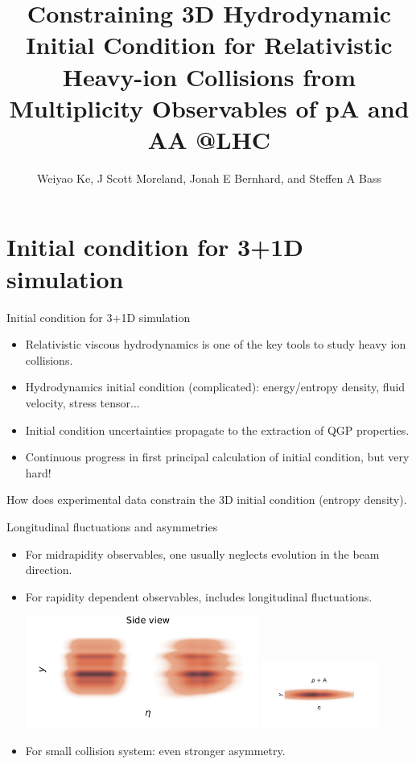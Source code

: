 \documentclass[11pt]{beamer}
\author[Weiyao Ke]{Weiyao Ke, J Scott Moreland, Jonah E Bernhard, and Steffen A Bass}
\title[3D Initial Condition]{Constraining 3D Hydrodynamic Initial Condition for Relativistic Heavy-ion Collisions from Multiplicity Observables of pA and AA @LHC }
\institute{Duke University}
\date{}
\begin{document}
\begin{frame}
\titlepage
\end{frame}

\section{Initial condition for 3+1D simulation}
\begin{frame}{Initial condition for 3+1D simulation}
\begin{itemize}
\item Relativistic viscous hydrodynamics is one of the key tools to study heavy ion collisions.
\item Hydrodynamics initial condition (complicated): energy/entropy density, fluid velocity, stress tensor...
\item Initial condition uncertainties propagate to the extraction of QGP properties.
\item Continuous progress in first principal calculation of initial condition, but very hard!
\end{itemize}
\begin{center}
\color{red} How does experimental data constrain the 3D initial condition (entropy density).
\end{center}
\end{frame}

\begin{frame}{Longitudinal fluctuations and asymmetries}
\begin{itemize}
\item For midrapidity observables, one usually neglects evolution in the beam direction.
\item For rapidity dependent observables, includes longitudinal fluctuations.
\begin{center}
\includegraphics[width=0.6\textwidth]{nuclei_demo.pdf}
\includegraphics[width=0.3\textwidth]{pPb.pdf} 
\end{center}
\item For small collision system: even stronger asymmetry.
\end{itemize}
\end{frame}
\end{document}
